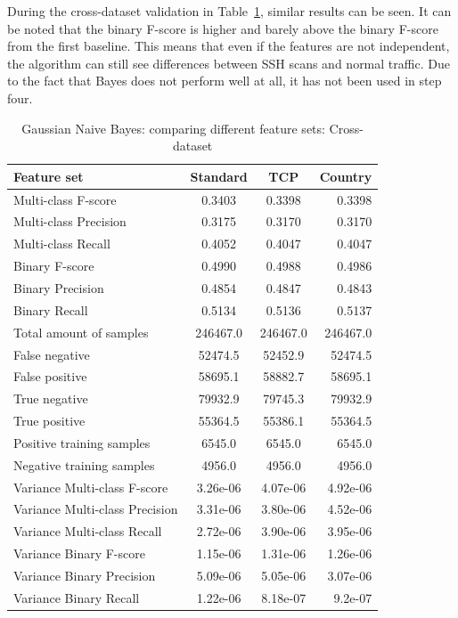 \noindent During the cross-dataset validation in Table~\ref{tab:bay:cross}, similar results can be seen. It can be noted that the binary F-score is higher and barely above the binary F-score from the first baseline. This means that even if the features are not independent, the algorithm can still see differences between SSH scans and normal traffic. Due to the fact that Bayes does not perform well at all, it has not been used in step four.

\begin{table}[H]
\caption{Gaussian Naive Bayes: comparing different feature sets: Cross-dataset}
\label{tab:bay:cross}
\centering
\begin{tabular}{l c c r}
\toprule
Feature set & Standard & TCP & Country \\
\midrule
Multi-class F-score & 0.3403 & 0.3398 & 0.3398 \\
Multi-class Precision & 0.3175 & 0.3170 & 0.3170 \\
Multi-class Recall & 0.4052 & 0.4047 & 0.4047 \\
\midrule
Binary F-score & 0.4990 & 0.4988 & 0.4986 \\
Binary Precision & 0.4854 & 0.4847 & 0.4843 \\
Binary Recall & 0.5134 & 0.5136 & 0.5137 \\
\midrule
Total amount of samples & 246467.0 & 246467.0 & 246467.0 \\
False negative & 52474.5  &  52452.9 & 52474.5 \\
False positive & 58695.1 & 58882.7 & 58695.1 \\
True negative & 79932.9 & 79745.3 & 79932.9  \\
True positive & 55364.5 & 55386.1 & 55364.5 \\
\midrule
Positive training samples & 6545.0 & 6545.0 & 6545.0\\
Negative training samples & 4956.0 & 4956.0 & 4956.0\\
\midrule
Variance Multi-class F-score & 3.26e-06 & 4.07e-06 & 4.92e-06\\
Variance Multi-class Precision & 3.31e-06 &  3.80e-06 & 4.52e-06 \\
Variance Multi-class Recall &  2.72e-06 & 3.90e-06 &  3.95e-06   \\
\midrule
Variance Binary F-score & 1.15e-06 & 1.31e-06 & 1.26e-06 \\
Variance Binary Precision & 5.09e-06 &  5.05e-06  & 3.07e-06   \\
Variance Binary Recall & 1.22e-06 &  8.18e-07 & 9.2e-07 \\
\bottomrule
\end{tabular}
\end{table}

